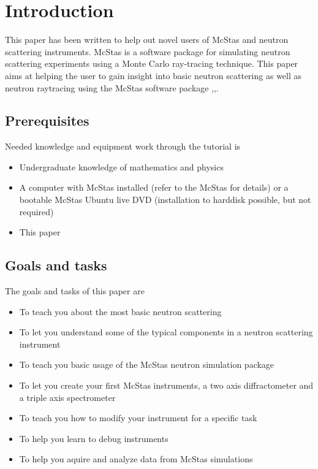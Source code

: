 \section{Introduction}
This paper has been written to help out novel users of McStas and neutron
scattering instruments. McStas is a software package for simulating
neutron scattering experiments using a Monte Carlo ray-tracing technique. This paper 
aims at helping the user to gain insight into basic neutron scattering 
as well as neutron raytracing using the McStas software package
\cite{McStas0},\cite{Manual},\cite{Websites}.
\subsection{Prerequisites}
Needed knowledge and equipment work through the tutorial is
\begin{itemize}
\item{Undergraduate knowledge of mathematics and physics}
\item{A computer with McStas installed (refer to the McStas
    \cite{Websites} for details) or a bootable McStas Ubuntu live DVD
    (installation to harddisk possible, but not required)}
\item{This paper}
\end{itemize}
\subsection{Goals and tasks}
The goals and tasks of this paper are
\begin{itemize}
\item{To teach you about the most basic neutron scattering}
\item{To let you understand some of the typical components in a
    neutron scattering instrument}
\item{To teach you basic usage of the McStas neutron simulation
    package}
\item{To let you create your first McStas instruments, a two axis diffractometer and a triple axis spectrometer}
\item{To teach you how to modify your instrument for a specific task}
\item{To help you learn to debug instruments}
\item{To help you aquire and analyze data from McStas simulations}
\end{itemize}
